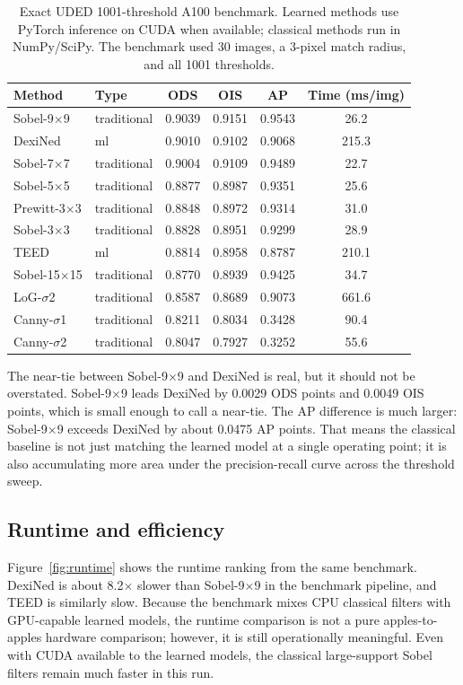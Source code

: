 \documentclass[conference]{IEEEtran}
\begin{document}
\begin{table}[t]
  \centering
  \footnotesize
  \setlength{\tabcolsep}{4.5pt}
  \renewcommand{\arraystretch}{1.15}
  \caption{Exact UDED 1001-threshold A100 benchmark. Learned methods use PyTorch inference on CUDA when available; classical methods run in NumPy/SciPy. The benchmark used 30 images, a 3-pixel match radius, and all 1001 thresholds.}
  \label{tab:metrics}
  \begin{tabular}{l l c c c c}
    \toprule
    Method & Type & ODS & OIS & AP & Time (ms/img) \\
    \midrule
    Sobel-9$\times$9  & traditional & 0.9039 & 0.9151 & 0.9543 & 26.2 \\
    DexiNed           & ml          & 0.9010 & 0.9102 & 0.9068 & 215.3 \\
    Sobel-7$\times$7  & traditional & 0.9004 & 0.9109 & 0.9489 & 22.7 \\
    Sobel-5$\times$5  & traditional & 0.8877 & 0.8987 & 0.9351 & 25.6 \\
    Prewitt-3$\times$3& traditional & 0.8848 & 0.8972 & 0.9314 & 31.0 \\
    Sobel-3$\times$3  & traditional & 0.8828 & 0.8951 & 0.9299 & 28.9 \\
    TEED              & ml          & 0.8814 & 0.8958 & 0.8787 & 210.1 \\
    Sobel-15$\times$15& traditional & 0.8770 & 0.8939 & 0.9425 & 34.7 \\
    LoG-$\sigma$2     & traditional & 0.8587 & 0.8689 & 0.9073 & 661.6 \\
    Canny-$\sigma$1   & traditional & 0.8211 & 0.8034 & 0.3428 & 90.4 \\
    Canny-$\sigma$2   & traditional & 0.8047 & 0.7927 & 0.3252 & 55.6 \\
    \bottomrule
  \end{tabular}
\end{table}

The near-tie between Sobel-9$\times$9 and DexiNed is real, but it should not be overstated. Sobel-9$\times$9 leads DexiNed by 0.0029 ODS points and 0.0049 OIS points, which is small enough to call a near-tie. The AP difference is much larger: Sobel-9$\times$9 exceeds DexiNed by about 0.0475 AP points. That means the classical baseline is not just matching the learned model at a single operating point; it is also accumulating more area under the precision-recall curve across the threshold sweep.

\subsection{Runtime and efficiency}
Figure~\ref{fig:runtime} shows the runtime ranking from the same benchmark. DexiNed is about 8.2$\times$ slower than Sobel-9$\times$9 in the benchmark pipeline, and TEED is similarly slow. Because the benchmark mixes CPU classical filters with GPU-capable learned models, the runtime comparison is not a pure apples-to-apples hardware comparison; however, it is still operationally meaningful. Even with CUDA available to the learned models, the classical large-support Sobel filters remain much faster in this run.
\end{document}
